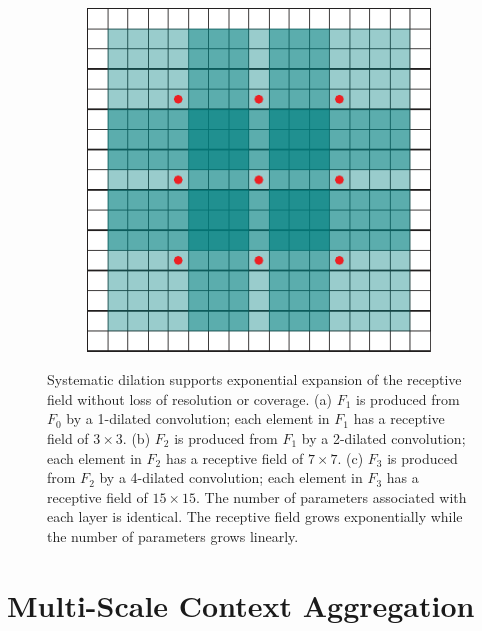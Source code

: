 \documentclass{article} %
\newcommand{\timess}{\mathbin{\!\times\!}}
\begin{document}
\begin{figure}[t]
\begin{center}
\begin{subfigure}[b]{0.3\linewidth}
        \caption{}
    \end{subfigure}
    ~~
    \begin{subfigure}[b]{0.3\linewidth}
        \includegraphics[width=\textwidth]{figs/exp_dilation_3.pdf}
        \caption{}
    \end{subfigure}
  \end{center}
  \vspace{-2mm}
  \caption{Systematic dilation supports exponential expansion of the receptive field without loss of resolution or coverage. (a) $F_1$ is produced from $F_0$ by a 1-dilated convolution; each element in $F_1$ has a receptive field of $3\timess 3$. (b) $F_2$ is produced from $F_1$ by a 2-dilated convolution; each element in $F_2$ has a receptive field of $7\timess 7$. (c) $F_3$ is produced from $F_2$ by a 4-dilated convolution; each element in $F_3$ has a receptive field of $15\timess 15$. The number of parameters associated with each layer is identical. The receptive field grows exponentially while the number of parameters grows linearly.}
  \label{fig:exponential}
  \vspace{-2mm}
\end{figure}


\section{Multi-Scale Context Aggregation}
\label{sec:context}
\end{document}
